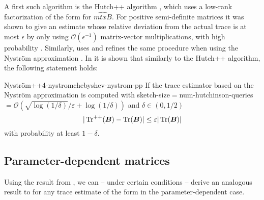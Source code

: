 A first such algorithm is the Hutch++ algorithm \cite[algorithm~1]{meyer2021hutch}, which
uses a low-rank factorization of the form  for
$\widehat{mtx{B}}$. For positive semi-definite matrices it was shown to give
an estimate whose relative deviation from the actual trace is at most
$\epsilon$ by only using $\mathcal{O}(\epsilon^{-1})$ matrix-vector multiplications,
with high probability \cite[theorem~1]{meyer2021hutch}. Similarly, \cite{lin2017randomized}
uses and \cite{persson2022hutch} refines the same procedure when using
the Nystr\"om approximation . In \cite[theorem~3.4]{persson2022hutch}
it is shown that similarly to the Hutch++ algorithm, the following statement holds:
\begin{theorem}{Nystr\"om++}{4-nystromchebyshev-nystrom-pp}
    If the trace estimator  based
    on the Nystr\"om approximation is computed
    with \gls{sketch-size}$ = $\gls{num-hutchinson-queries}$ = \mathcal{O}(\sqrt{\log(1/\delta)}/\varepsilon + \log(1/\delta))$
    and $\delta \in (0, 1/2)$
    \begin{equation}
        |\operatorname{Tr}^{++}(\boldsymbol{B}) - \operatorname{Tr}(\boldsymbol{B})| \leq \varepsilon |\operatorname{Tr}(\boldsymbol{B})|
    \end{equation}
    with probability at least $1-\delta$.
\end{theorem}

\subsection{Parameter-dependent matrices}
\label{subsec:4-nystromchebyshev-reduction-parametrized-matrices}

Using the result from ,
we can -- under certain conditions -- derive an analogous result
to  for any trace estimate of the form
 in the parameter-dependent case.

